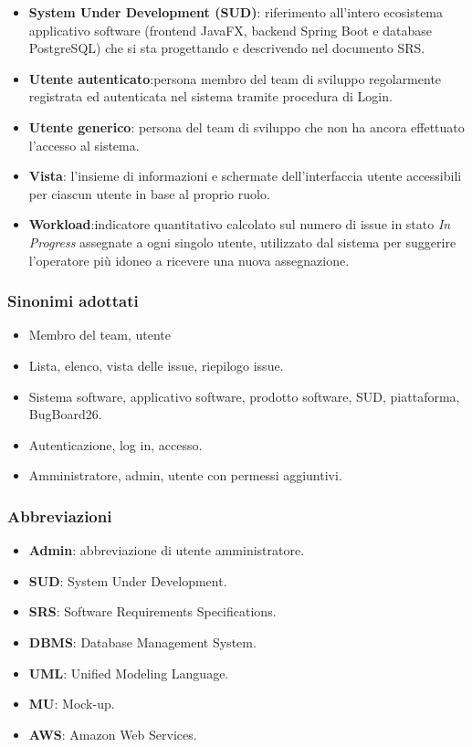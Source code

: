 \documentclass[a4paper,12pt]{article}
\begin{document}
\begin{itemize}
    \item \textbf{System Under Development (SUD)}: riferimento all'intero ecosistema applicativo software (frontend JavaFX, backend Spring Boot e database PostgreSQL) che si sta progettando e descrivendo nel documento SRS.

    \item \textbf{Utente autenticato}:persona membro del team di sviluppo regolarmente registrata ed autenticata nel sistema tramite procedura di Login.

    \item \textbf{Utente generico}: persona del team di sviluppo che non ha ancora effettuato l'accesso al sistema.

    \item \textbf{Vista}: l'insieme di informazioni e schermate dell'interfaccia utente accessibili per ciascun utente in base al proprio ruolo.

    \item \textbf{Workload}:indicatore quantitativo calcolato sul numero di issue in stato \textit{In Progress} assegnate a ogni singolo utente, utilizzato dal sistema per suggerire l'operatore più idoneo a ricevere una nuova assegnazione. 
\end{itemize}

\subsubsection{Sinonimi adottati}
\begin{itemize}
    \item Membro del team, utente
    \item Lista, elenco, vista delle issue, riepilogo issue.
    \item Sistema software, applicativo software, prodotto software, SUD, piattaforma, BugBoard26.
    \item Autenticazione, log in, accesso.
    \item Amministratore, admin, utente con permessi aggiuntivi.
\end{itemize}

\subsubsection{Abbreviazioni}
\begin{itemize}
    \item \textbf{Admin}: abbreviazione di utente amministratore.
    \item \textbf{SUD}: System Under Development.
    \item \textbf{SRS}: Software Requirements Specifications.
    \item \textbf{DBMS}: Database Management System.
    \item \textbf{UML}: Unified Modeling Language.
    \item \textbf{MU}: Mock-up.
    \item \textbf{AWS}: Amazon Web Services.
\end{itemize}
\end{document}
